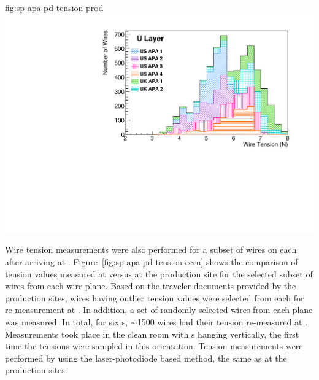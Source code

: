 \begin{dunefigure}{fig:sp-apa-pd-tension-prod}
\includegraphics[height=0.28\textheight,trim=0mm 0mm 0mm 0mm,clip]{graphics/sp-apa-U-layer-tensions.pdf}
\end{dunefigure}

Wire tension measurements were also performed for a subset of wires on each  after arriving at . Figure~\ref{fig:sp-apa-pd-tension-cern} shows the comparison of tension values measured at  versus at the production site for the selected subset of wires from each wire plane. Based on the traveler documents provided by the production sites, wires having outlier tension values were selected from each  for re-measurement at . In addition, a set of randomly selected wires from each plane was measured. In total, for six s, $\sim$1500 wires had their tension re-measured at . Measurements took place in the clean room with s hanging vertically, the first time the tensions were sampled in this orientation. Tension measurements were performed by using the laser-photodiode based method, the same as at the production sites. 

